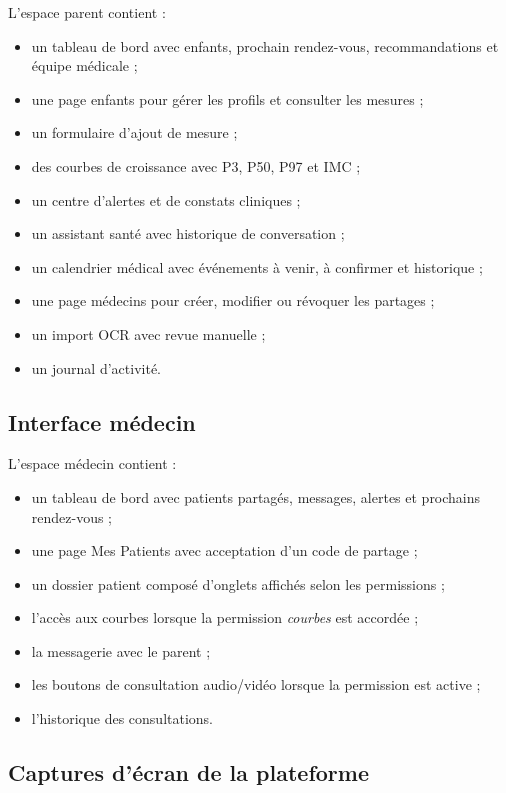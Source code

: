 L'espace parent contient :

\begin{itemize}
    \item un tableau de bord avec enfants, prochain rendez-vous, recommandations et équipe médicale ;
    \item une page enfants pour gérer les profils et consulter les mesures ;
    \item un formulaire d'ajout de mesure ;
    \item des courbes de croissance avec P3, P50, P97 et IMC ;
    \item un centre d'alertes et de constats cliniques ;
    \item un assistant santé avec historique de conversation ;
    \item un calendrier médical avec événements à venir, à confirmer et historique ;
    \item une page médecins pour créer, modifier ou révoquer les partages ;
    \item un import OCR avec revue manuelle ;
    \item un journal d'activité.
\end{itemize}

\subsection{Interface médecin}

L'espace médecin contient :

\begin{itemize}
    \item un tableau de bord avec patients partagés, messages, alertes et prochains rendez-vous ;
    \item une page Mes Patients avec acceptation d'un code de partage ;
    \item un dossier patient composé d'onglets affichés selon les permissions ;
    \item l'accès aux courbes lorsque la permission \textit{courbes} est accordée ;
    \item la messagerie avec le parent ;
    \item les boutons de consultation audio/vidéo lorsque la permission est active ;
    \item l'historique des consultations.
\end{itemize}

\subsection{Captures d'écran de la plateforme}

